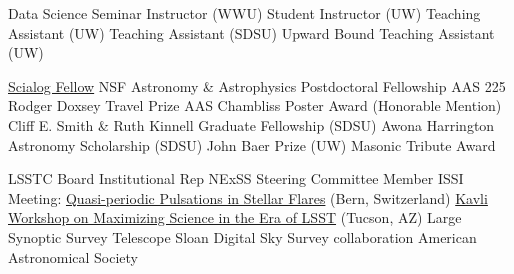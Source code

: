 \documentclass{article}
\begin{document}
\begin{llist}
{\sc Data Science Seminar Instructor (WWU)} 
{\sc Student Instructor (UW)} 
{\sc Teaching Assistant (UW)} 
{\sc Teaching Assistant (SDSU)} 
{\sc Upward Bound Teaching Assistant (UW)} 


{\sc \href{http://rescorp.org/scialog/time-domain-astrophysics}{\color{blue}Scialog Fellow}} 
{\sc NSF Astronomy \& Astrophysics Postdoctoral Fellowship} 
{\sc AAS 225 Rodger Doxsey Travel Prize}
{\sc AAS Chambliss Poster Award} (Honorable Mention)
{\sc Cliff E. Smith \& Ruth Kinnell Graduate Fellowship (SDSU)}
{\sc Awona Harrington Astronomy Scholarship (SDSU)}
{\sc John Baer Prize (UW)}
{\sc Masonic Tribute Award}



LSSTC Board Institutional Rep
NExSS Steering Committee Member
{\sc ISSI Meeting}: \href{http://www.issibern.ch/program/teams.html#Teams2016}{\color{blue}Quasi-periodic Pulsations in Stellar Flares} (Bern, Switzerland)
{\sc \href{http://www.noao.edu/meetings/lsst-oir-study-meeting/}{\color{blue}Kavli Workshop on Maximizing Science in the Era of LSST}} (Tucson, AZ) 
{\sc Large Synoptic Survey Telescope} 
{\sc Sloan Digital Sky Survey collaboration} 
{\sc American Astronomical Society} 




\end{llist}
\end{document}
